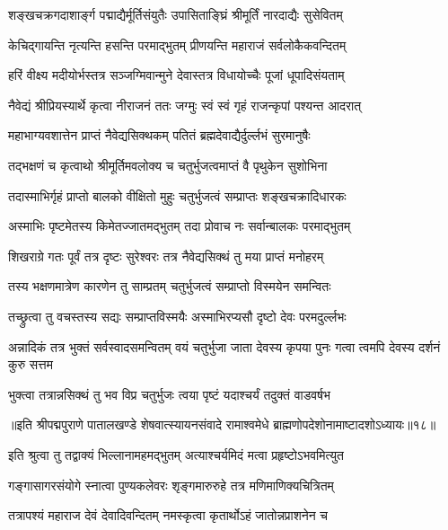 \twolineshloka
{शङ्खचक्रगदाशार्ङ्ग पद्माद्यैर्मूर्तिसंयुतैः}
{उपासिताङ्घ्रिं श्रीमूर्तिं नारदाद्यैः सुसेवितम्}%

\twolineshloka
{केचिद्गायन्ति नृत्यन्ति हसन्ति परमाद्भुतम्}
{प्रीणयन्ति महाराजं सर्वलोकैकवन्दितम्}%

\twolineshloka
{हरिं वीक्ष्य मदीयोर्भस्तत्र सञ्जग्मिवान्मुने}
{देवास्तत्र विधायोच्चैः पूजां धूपादिसंयताम्}%

\twolineshloka
{नैवेद्यं श्रीप्रियस्यार्थे कृत्वा नीराजनं ततः}
{जग्मुः स्वं स्वं गृहं राजन्कृपां पश्यन्त आदरात्}%

\twolineshloka
{महाभाग्यवशात्तेन प्राप्तं नैवेद्यसिक्थकम्}
{पतितं ब्रह्मदेवाद्यैर्दुर्ल्लभं सुरमानुषैः}%

\twolineshloka
{तद्भक्षणं च कृत्वाथो श्रीमूर्तिमवलोक्य च}
{चतुर्भुजत्वमाप्तं वै पृथुकेन सुशोभिना}%

\twolineshloka
{तदास्माभिर्गृहं प्राप्तो बालको वीक्षितो मुहुः}
{चतुर्भुजत्वं सम्प्राप्तः शङ्खचक्रादिधारकः}%

\twolineshloka
{अस्माभिः पृष्टमेतस्य किमेतज्जातमद्भुतम्}
{तदा प्रोवाच नः सर्वान्बालकः परमाद्भुतम्}%

\twolineshloka
{शिखराग्रे गतः पूर्वं तत्र दृष्टः सुरेश्वरः}
{तत्र नैवेद्यसिक्थं तु मया प्राप्तं मनोहरम्}%

\twolineshloka
{तस्य भक्षणमात्रेण कारणेन तु साम्प्रतम्}
{चतुर्भुजत्वं सम्प्राप्तो विस्मयेन समन्वितः}%

\twolineshloka
{तच्छ्रुत्वा तु वचस्तस्य सद्यः सम्प्राप्तविस्मयैः}
{अस्माभिरप्यसौ दृष्टो देवः परमदुर्ल्लभः}%



{अन्नादिकं तत्र भुक्तं सर्वस्वादसमन्वितम्}
{वयं चतुर्भुजा जाता देवस्य कृपया पुनः}
{गत्वा त्वमपि देवस्य दर्शनं कुरु सत्तम}%

\twolineshloka
{भुक्त्वा तत्रान्नसिक्थं तु भव विप्र चतुर्भुजः}
{त्वया पृष्टं यदाश्चर्यं तदुक्तं वाडवर्षभ}%

{॥इति श्रीपद्मपुराणे पातालखण्डे शेषवात्स्यायनसंवादे रामाश्वमेधे ब्राह्मणोपदेशोनामाष्टादशोऽध्यायः॥१८॥}



\twolineshloka
{इति श्रुत्वा तु तद्वाक्यं भिल्लानामहमद्भुतम्}
{अत्याश्चर्यमिदं मत्वा प्रहृष्टोऽभवमित्युत}%

\twolineshloka
{गङ्गासागरसंयोगे स्नात्वा पुण्यकलेवरः}
{शृङ्गमारुरुहे तत्र मणिमाणिक्यचित्रितम्}%

\twolineshloka
{तत्रापश्यं महाराज देवं देवादिवन्दितम्}
{नमस्कृत्वा कृतार्थोऽहं जातोन्नप्राशनेन च}%

